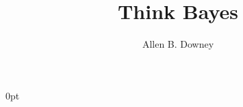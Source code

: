 \documentclass[12pt]{book}
\title{Think Bayes}
\author{Allen B. Downey}
\newif\ifplastex
\begin{document}
\frontmatter

\ifplastex

\else
\fi

\newcommand{\PMF}{\mathrm{PMF}}
\newcommand{\PDF}{\mathrm{PDF}}
\newcommand{\CDF}{\mathrm{CDF}}
\newcommand{\ICDF}{\mathrm{ICDF}}

\ifplastex
    \usepackage{localdef}
    \maketitle

\else

  {\topsep}%
  {\topsep}%
  {}%
  {0pt}%
  {\bfseries}%
  {}%
  { }%
  {}%

\theoremstyle{exercise}
\newtheorem{exercise}{Exercise}[chapter]


\end{document}
